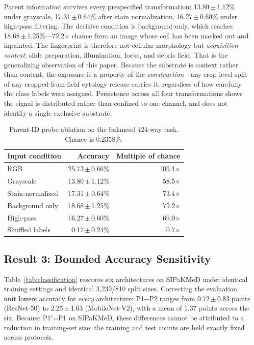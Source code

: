\documentclass[conference]{IEEEtran}
\newcommand{\meanpm}[2]{#1\,$\pm$\,#2}
\newcommand{\protocol}[1]{\textsf{#1}}
\begin{document}
Parent information survives every prespecified transformation: \meanpm{13.80}{1.12}\% under grayscale, \meanpm{17.31}{0.64}\% after stain normalization, \meanpm{16.27}{0.60}\% under high-pass filtering.
The decisive condition is background-only, which reaches \meanpm{18.68}{1.25}\%---79.2$\times$ chance from an image whose cell has been masked out and inpainted.
The fingerprint is therefore not cellular morphology but \emph{acquisition context}: slide preparation, illumination, focus, and debris field.
That is the generalizing observation of this paper.
Because the substrate is context rather than content, the exposure is a property of the \emph{construction}---any crop-level split of any cropped-from-field cytology release carries it, regardless of how carefully the class labels were assigned.
Persistence across all four transformations shows the signal is distributed rather than confined to one channel, and does not identify a single exclusive substrate.

\begin{table}[t]
\caption{Parent-ID probe ablation on the balanced 424-way task. Chance is 0.2358\%.}
\label{tab:probe}
\centering
\scriptsize
\setlength{\tabcolsep}{4.2pt}
\begin{tabular}{lrr}
\toprule
Input condition & Accuracy & Multiple of chance \\
\midrule
RGB & \meanpm{25.73}{0.66}\% & 109.1$\times$ \\
Grayscale & \meanpm{13.80}{1.12}\% & 58.5$\times$ \\
Stain-normalized & \meanpm{17.31}{0.64}\% & 73.4$\times$ \\
Background only & \meanpm{18.68}{1.25}\% & 79.2$\times$ \\
High-pass & \meanpm{16.27}{0.60}\% & 69.0$\times$ \\
Shuffled labels & \meanpm{0.17}{0.24}\% & 0.7$\times$ \\
\bottomrule
\end{tabular}
\end{table}

\subsection{Result 3: Bounded Accuracy Sensitivity}
Table~\ref{tab:classification} rescores six architectures on SIPaKMeD under identical training settings and identical 3,239/810 split sizes.
Correcting the evaluation unit lowers accuracy for \emph{every} architecture: \protocol{P1}$-$\protocol{P2} ranges from \meanpm{0.72}{0.83} points (ResNet-50) to \meanpm{2.25}{1.63} (MobileNet-V2), with a mean of 1.37 points across the six.
Because \protocol{P1$'$}=\protocol{P1} on SIPaKMeD, these differences cannot be attributed to a reduction in training-set size; the training and test counts are held exactly fixed across protocols.
\end{document}
